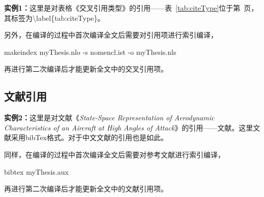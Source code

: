 {\bf{实例1：}}这里是对表格《交叉引用类型》的引用——表~\ref{tab:citeType}位于第~\pageref{tab:citeType}页，其标签为\textbackslash label\{tab:citeType\}。

另外，在编译的过程中首次编译全文后需要对引用项进行索引编译，

\begin{center}
  {\color{blue}makeindex myThesis.nlo -s nomencl.ist -o myThesis.nls}
\end{center}

再进行第二次编译后才能更新全文中的交叉引用项。

\subsection{文献引用}
\label{sec:citeRefs}

{\bf{实例2：}}这里是对文献《{\it{State-Space Representation of Aerodynamic Characteristics of an Aircraft at High Angles of Attack}}》的引用——文献\cite{Goman:state_aerodynamics}。这里文献采用bibTex格式。对于中文文献的引用也是如此\cite{BUAA:2002-CFD-missile}。

同样，在编译的过程中首次编译全文后需要对参考文献进行索引编译，

\begin{center}
  {\color{blue}bibtex myThesis.aux}
\end{center}

再进行第二次编译后才能更新全文中的文献引用项。
